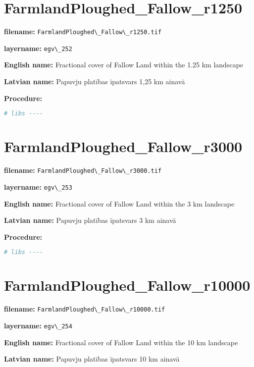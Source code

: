 \documentclass[
]{book}
\newcommand{\passthrough}[1]{#1}
\begin{document}
\section{FarmlandPloughed\_Fallow\_r1250}\label{ch06.252}

\textbf{filename:} \passthrough{\lstinline!FarmlandPloughed\_Fallow\_r1250.tif!}

\textbf{layername:} \passthrough{\lstinline!egv\_252!}

\textbf{English name:} Fractional cover of Fallow Land within the 1.25 km landscape

\textbf{Latvian name:} Papuvju platības īpatsvars 1,25 km ainavā

\textbf{Procedure:}

\begin{lstlisting}[language=R]
# libs ----
\end{lstlisting}

\section{FarmlandPloughed\_Fallow\_r3000}\label{ch06.253}

\textbf{filename:} \passthrough{\lstinline!FarmlandPloughed\_Fallow\_r3000.tif!}

\textbf{layername:} \passthrough{\lstinline!egv\_253!}

\textbf{English name:} Fractional cover of Fallow Land within the 3 km landscape

\textbf{Latvian name:} Papuvju platības īpatsvars 3 km ainavā

\textbf{Procedure:}

\begin{lstlisting}[language=R]
# libs ----
\end{lstlisting}

\section{FarmlandPloughed\_Fallow\_r10000}\label{ch06.254}

\textbf{filename:} \passthrough{\lstinline!FarmlandPloughed\_Fallow\_r10000.tif!}

\textbf{layername:} \passthrough{\lstinline!egv\_254!}

\textbf{English name:} Fractional cover of Fallow Land within the 10 km landscape

\textbf{Latvian name:} Papuvju platības īpatsvars 10 km ainavā
\end{document}
